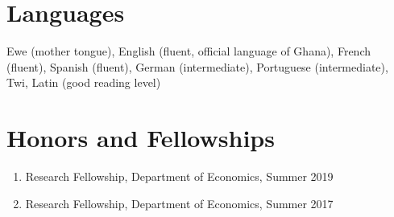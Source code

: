 \documentclass[letterpaper]{article}
\begin{document}
\section*{Languages}
Ewe (mother tongue), English (fluent, official language of Ghana), French (fluent), Spanish (fluent), German (intermediate),  Portuguese (intermediate), Twi, Latin (good reading level)

\section*{Honors and Fellowships}
\begin{enumerate}
  \item Research Fellowship, Department of Economics, Summer 2019
  \item Research Fellowship, Department of Economics, Summer 2017
\end{enumerate}
\end{document}
